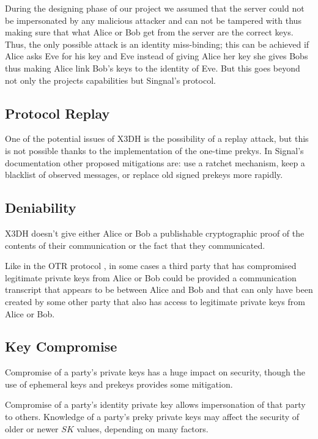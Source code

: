 During the designing phase of our project we assumed that the server could not be impersonated by any malicious attacker and can not be tampered with thus making sure that what Alice or Bob get from the server are the correct keys. Thus, the only possible attack is an identity miss-binding; this can be achieved if Alice asks Eve for his key and Eve instead of giving Alice her key she gives Bobs thus making Alice link Bob's keys to the identity of Eve. But this goes beyond not only the projects capabilities but Singnal's protocol.

\subsection{Protocol Replay}
\label{subsec:ProtocolReplay}

One of the potential issues of X3DH is the possibility of a replay attack, but this is not possible thanks to the implementation of the one-time prekys. In Signal's documentation other proposed mitigations are: use a ratchet mechanism, keep a blacklist of observed messages, or replace old signed prekeys more rapidly.

\subsection{Deniability}
\label{subsec:Deniability}

X3DH doesn’t give either Alice or Bob a publishable cryptographic proof of the contents of their communication or the fact that they communicated.

Like in the OTR protocol \cite{OTR}, in some cases a third party that has compromised legitimate private keys from Alice or Bob could be provided a communication transcript that appears to be between Alice and Bob and that can only have been created by some other party that also has access to legitimate private keys from Alice or Bob.

\subsection{Key Compromise}
\label{subsec:KeyCompromise}

Compromise of a party's private keys has a huge impact on security, though the use of ephemeral keys and prekeys provides some mitigation.

Compromise of a party's identity private key allows impersonation of that party to others. Knowledge of a party's preky private keys may affect the security of older or newer $SK$ values, depending on many factors.

